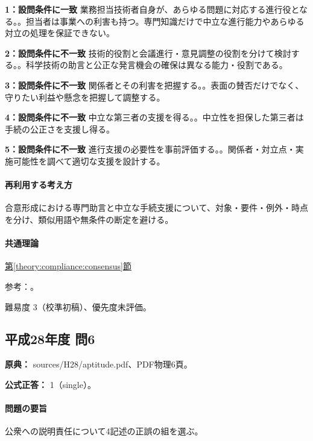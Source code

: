 \noindent\textbf{1：設問条件に一致} 業務担当技術者自身が、あらゆる問題に対応する進行役となる。。担当者は事業への利害も持つ。専門知識だけで中立な進行能力やあらゆる対立の処理を保証できない。\par

\noindent\textbf{2：設問条件に不一致} 技術的役割と会議進行・意見調整の役割を分けて検討する。。科学技術の助言と公正な発言機会の確保は異なる能力・役割である。\par

\noindent\textbf{3：設問条件に不一致} 関係者とその利害を把握する。。表面の賛否だけでなく、守りたい利益や懸念を把握して調整する。\par

\noindent\textbf{4：設問条件に不一致} 中立な第三者の支援を得る。。中立性を担保した第三者は手続の公正さを支援し得る。\par

\noindent\textbf{5：設問条件に不一致} 進行支援の必要性を事前評価する。。関係者・対立点・実施可能性を調べて適切な支援を設計する。\par

\paragraph{再利用する考え方} 合意形成における専門助言と中立な手続支援について、対象・要件・例外・時点を分け、類似用語や無条件の断定を避ける。

\paragraph{共通理論} \hyperref[theory:compliance:consensus]{第\ref*{theory:compliance:consensus}節}

\par 参考：\cite{mlit_mediation2006,mlit_pi_thirdparty}。

\par 難易度 3（校準初稿）、優先度未評価。

\subsection{平成28年度 問6}
\label{q:h28-reg-apt-06}

\noindent\textbf{原典：} sources/H28/aptitude.pdf、PDF物理6頁。

\textbf{公式正答：} 1（single）。

\paragraph{問題の要旨} 公衆への説明責任について4記述の正誤の組を選ぶ。

